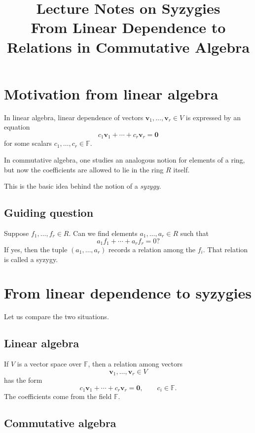 \documentclass[11pt]{article}
\title{Lecture Notes on Syzygies\\
	\large From Linear Dependence to Relations in Commutative Algebra}
\author{}
\date{}
\theoremstyle{definition}
\theoremstyle{remark}
\newcommand{\F}{\mathbb{F}}
\begin{document}
	
	\maketitle
	
	\tableofcontents
	
	\section{Motivation from linear algebra}
	
	In linear algebra, linear dependence of vectors \(\textbf{v}_1,\dots,\textbf{v}_r\in V\) is expressed by an equation
	\[
	c_1\textbf{v}_1+\cdots+c_r\textbf{v}_r=\textbf{0}
	\]
	for some scalars \(c_1,\dots,c_r\in\F\).
	
	In commutative algebra, one studies an analogous notion for elements of a ring, but now the coefficients are allowed to lie in the ring \(R\) itself.
	
	This is the basic idea behind the notion of a \emph{syzygy}.
	
	\subsection*{Guiding question}
	
	Suppose \(f_1,\dots,f_r\in R\).  
	Can we find elements \(a_1,\dots,a_r\in R\) such that
	\[
	a_1f_1+\cdots+a_rf_r=0?
	\]
	If yes, then the tuple \((a_1,\dots,a_r)\) records a relation among the \(f_i\).  
	That relation is called a syzygy.
	
	\section{From linear dependence to syzygies}
	
	Let us compare the two situations.
	
	\subsection{Linear algebra}
	
	If \(V\) is a vector space over \(\F\), then a relation among vectors
	\[
	\textbf{v}_1,\dots,\textbf{v}_r\in V
	\]
	has the form
	\[
	c_1\textbf{v}_1+\cdots+c_r\textbf{v}_r=\textbf{0},
	\qquad c_i\in \F.
	\]
	The coefficients come from the field \(\F\).
	
	\subsection{Commutative algebra}
	
\end{document}
